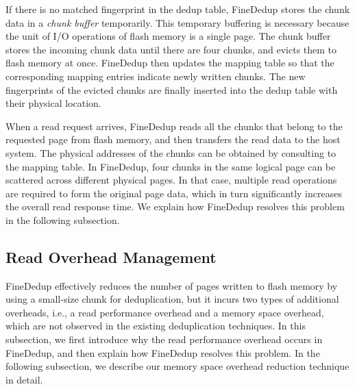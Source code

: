 If there is no matched fingerprint in the dedup table,
FineDedup stores the chunk data in a \textit{chunk buffer} temporarily.
This temporary buffering is necessary 
because the unit of I/O operations of flash memory is a single page.
The chunk buffer stores the incoming chunk data until there are four chunks,
and evicts them to flash memory at once.
FineDedup then updates the mapping table 
so that the corresponding mapping entries indicate newly written chunks.
The new fingerprints of the evicted chunks are finally inserted into the dedup table with their physical location.

When a read request arrives,
FineDedup reads all the chunks that belong to the requested page from flash memory,
and then transfers the read data to the host system.
The physical addresses of the chunks can be obtained by consulting to the mapping table.
In FineDedup, four chunks in the same logical page can be scattered across different physical pages.
In that case, multiple read operations are required to form the original page data,
which in turn significantly increases the overall read response time.
We explain how FineDedup resolves this problem in the following subsection.

\subsection{Read Overhead Management}

FineDedup effectively reduces the number of pages written to flash memory
by using a small-size chunk for deduplication,
but it incurs two types of additional overheads, i.e.,
a read performance overhead and a memory space overhead,
which are not observed in the existing deduplication techniques.
In this subsection, 
we first introduce why the read performance overhead occurs in FineDedup,
and then explain how FineDedup resolves this problem.
In the following subsection, 
we describe our memory space overhead reduction technique in detail.

